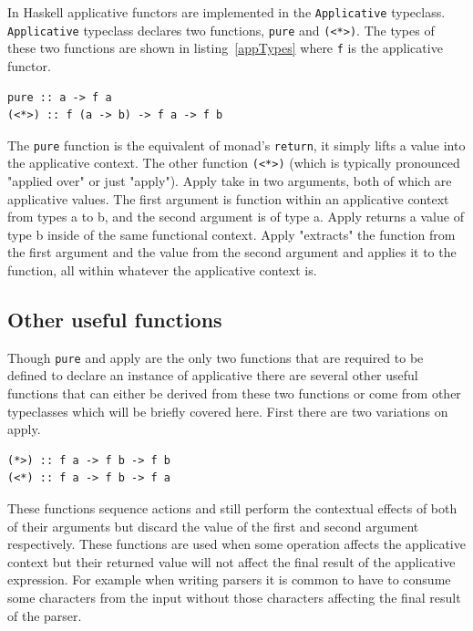 In Haskell applicative functors are implemented in the \texttt{Applicative} typeclass. \texttt{Applicative} typeclass declares two functions, \texttt{pure} and \texttt{(<*>)}. The types of these two functions are shown in listing~\ref{appTypes} where \texttt{f} is the applicative functor. 

\begin{lstlisting}[frame=tblr,label=appTypes,caption={Types of Applicative's minimal complete definition}]
pure :: a -> f a
(<*>) :: f (a -> b) -> f a -> f b
\end{lstlisting}

The \texttt{pure} function is the equivalent of monad's \texttt{return}, it simply lifts a value into the applicative context. The other function \texttt{(<*>)} (which is typically pronounced "applied over" or just "apply"). Apply take in two arguments, both of which are applicative values. The first argument is function within an applicative context from types a to b, and the second argument is of type a. Apply returns a value of type b inside of the same functional context. Apply "extracts" the function from the first argument and the value from the second argument and applies it to the function, all within whatever the applicative context is.

\subsection{Other useful functions}

Though \texttt{pure} and apply are the only two functions that are required to be defined to declare an instance of applicative there are several other useful functions that can either be derived from these two functions or come from other typeclasses which will be briefly covered here. First there are two variations on apply.

\begin{lstlisting}[frame=tblr]
(*>) :: f a -> f b -> f b
(<*) :: f a -> f b -> f a
\end{lstlisting}

These functions sequence actions and still perform the contextual effects of both of their arguments but discard the value of the first and second argument respectively. These functions are used when some operation affects the applicative context but their returned value will not affect the final result of the applicative expression. For example when writing parsers it is common to have to consume some characters from the input without those characters affecting the final result of the parser.

